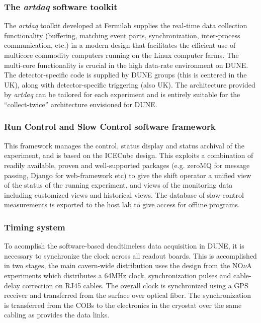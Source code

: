 \subsubsection{The \textit{artdaq} software toolkit}

The \textit{artdaq} toolkit developed at  Fermilab supplies the real-time
data collection functionality (buffering, matching event parts,
synchronization, inter-process communication, etc.) in a modern
design that facilitates the efficient use of multicore commodity
computers running on the Linux computer farms.  The multi-core
functionality is crucial in the high data-rate environment on DUNE.  
The detector-specific code is supplied by DUNE groups (this is centered in the UK),
along with detector-specific triggering (also UK).  The architecture
provided by \textit{artdaq} can be tailored for each experiment and is entirely
suitable for the ``collect-twice'' architecture envisioned for DUNE.

\subsubsection{Run Control and Slow Control software framework}

This framework manages the control, status display and status archival of the experiment,
and is based on the ICECube design.  This exploits a combination of readily available, proven and
well-supported packages (e.g. zeroMQ for message passing, Django for web-framework etc) 
to give the shift operator a unified view of the status
of the running experiment, and views of the monitoring data including
customized views and historical views.  The database of slow-control
measurements is exported to the host lab to give access for offline
programs.

\subsubsection{Timing system}
To acomplish the software-based deadtimeless data
acquisition in DUNE, it is necessary to synchronize the clock across
all readout boards.  This is accomplished in two stages, the main
cavern-wide distribution uses the design from the NO$\nu$A experiments
which distributes a 64MHz clock, synchronization pulses and
cable-delay correction on RJ45 cables.  The overall clock is
synchronized using a GPS receiver and transferred from the surface
over optical fiber.  The synchronization is transferred from the COBs
to the electronics in the cryostat over the same cabling as provides
the data links.

